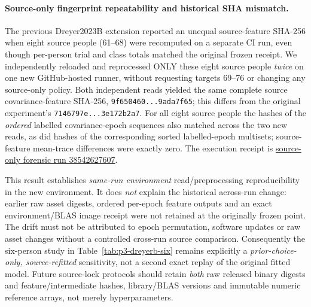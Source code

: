 \paragraph{Source-only fingerprint repeatability and historical SHA mismatch.}
\label{sec:p3-dreyerb-source-hash-forensics}
The previous Dreyer2023B extension reported an unequal
source-feature SHA-256 when eight source people (61--68)
were recomputed on a separate CI run, even though
per-person trial and class totals matched the original
frozen receipt. We independently reloaded and
reprocessed ONLY these eight source people \emph{twice}
on one new GitHub-hosted runner, without requesting
targets 69--76 or changing any source-only policy.
Both independent reads yielded the same complete
source covariance-feature SHA-256,
\texttt{9f650460...9ada7f65}; this differs from
the original experiment's
\texttt{7146797e...3e172b2a7}.
For all eight source people the hashes of
the \emph{ordered} labelled covariance-epoch
sequences also matched across the two new reads,
as did hashes of the corresponding sorted
labelled-epoch multisets; source-feature
mean-trace differences were exactly zero.
The execution receipt is
\href{https://github.com/lindicaphxag-tech/kaggle/actions/runs/38542627607}
{source-only forensic run 38542627607}.

This result establishes \emph{same-run environment}
read/preprocessing reproducibility in the new
environment. It does \emph{not} explain the historical
across-run change: earlier raw asset digests,
ordered per-epoch feature outputs and an exact
environment/BLAS image receipt were not retained
at the originally frozen point. The drift
must not be attributed to epoch permutation,
software updates or raw asset changes without
a controlled cross-run source comparison.
Consequently the six-person study in
Table~\ref{tab:p3-dreyerb-six} remains explicitly
a \emph{prior-choice-only, source-refitted}
sensitivity, not a second exact replay of
the original fitted model. Future source-lock
protocols should retain \emph{both} raw released
binary digests and feature/intermediate hashes,
library/BLAS versions and immutable numeric
reference arrays, not merely hyperparameters.
